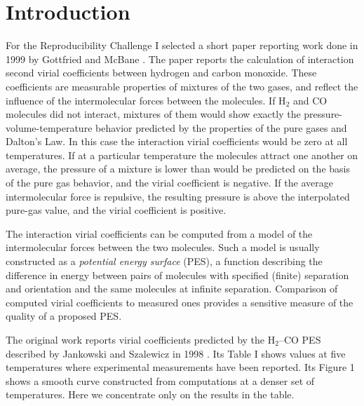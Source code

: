 \section{Introduction}

For the Reproducibility Challenge I selected a short paper reporting work done in 1999 by Gottfried and McBane \cite{gott00}.  The paper reports the calculation of interaction second virial coefficients between hydrogen and carbon monoxide.  These coefficients are measurable properties of mixtures of the two gases, and reflect the influence of the intermolecular forces between the molecules.  If H$_2$ and CO molecules did not interact, mixtures of them would show exactly the pressure-volume-temperature behavior predicted by the properties of the pure gases and Dalton's Law.  In this case the interaction virial coefficients would be zero at all temperatures. If at a particular temperature the molecules attract one another on average, the pressure of a mixture is  lower than would be predicted on the basis of the pure gas behavior, and the virial coefficient is negative.  If the average intermolecular force is repulsive, the resulting pressure is  above the interpolated pure-gas value, and the virial coefficient is positive.

The interaction virial coefficients can be computed from a model of the intermolecular forces between the two molecules.   Such a model is usually constructed as  a \emph{potential energy surface} (PES), a function describing the difference in energy between pairs of molecules with specified (finite) separation and orientation and the same molecules at infinite separation.  Comparison of computed virial coefficients to measured ones provides a sensitive measure of the quality of a proposed PES.



The original work reports virial coefficients predicted by the H$_2$--CO PES described by Jankowski and Szalewicz in 1998 \cite{jank98}.  Its Table I shows values at five temperatures where experimental measurements have been reported.  Its  Figure 1 shows a smooth curve constructed from computations at a denser set of temperatures.  Here we concentrate only on the results in the table.

